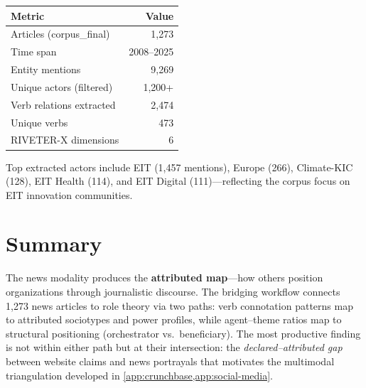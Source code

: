 \documentclass[../main.tex]{subfiles}
\begin{document}
\tableminimal
\begin{center}
\begin{tabular}{@{}lr@{}}
\toprule
\textbf{Metric} & \textbf{Value} \\
\midrule
Articles (corpus\_final) & 1{,}273 \\
Time span & 2008--2025 \\
Entity mentions & 9{,}269 \\
Unique actors (filtered) & 1{,}200+ \\
Verb relations extracted & 2{,}474 \\
Unique verbs & 473 \\
RIVETER-X dimensions & 6 \\
\bottomrule
\end{tabular}
\label{tab:news-corpus-stats}
\end{center}

Top extracted actors include EIT (1,457 mentions),
Europe (266), Climate-KIC (128), EIT Health (114),
and EIT Digital (111)---reflecting the corpus focus
on EIT innovation communities.


\section{Summary}

\begin{summarybox}
The news modality produces the \textbf{attributed map}---how others
position organizations through journalistic discourse.
The bridging workflow connects 1,273 news articles to role theory
via two paths: verb connotation patterns map to attributed sociotypes
and power profiles, while agent--theme ratios map to structural
positioning (orchestrator vs.\ beneficiary).
The most productive finding is not within either path but at their
intersection: the \emph{declared--attributed gap} between website
claims and news portrayals that motivates the multimodal
triangulation developed in \cref{app:crunchbase,app:social-media}.
\end{summarybox}

\clearpage
{}
\end{document}
